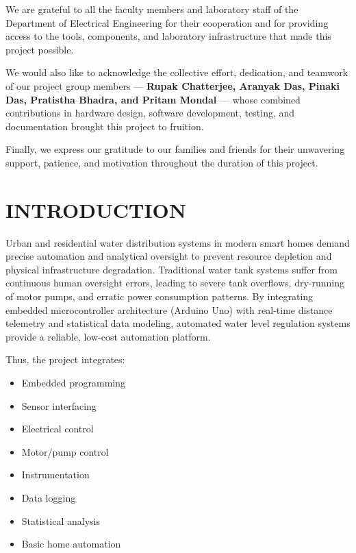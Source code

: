\documentclass[12pt,a4paper]{article}
\begin{document}
We are grateful to all the faculty members and laboratory staff of the Department of Electrical Engineering for their cooperation and for providing access to the tools, components, and laboratory infrastructure that made this project possible.

We would also like to acknowledge the collective effort, dedication, and teamwork of our project group members --- \textbf{Rupak Chatterjee, Aranyak Das, Pinaki Das, Pratistha Bhadra, and Pritam Mondal} --- whose combined contributions in hardware design, software development, testing, and documentation brought this project to fruition.

Finally, we express our gratitude to our families and friends for their unwavering support, patience, and motivation throughout the duration of this project.
\newpage

\tableofcontents

\newpage
\listoffigures


\listoftables


\newpage

\newpage
{}
\setcounter{page}{1}

\section{INTRODUCTION}

Urban and residential water distribution systems in modern smart homes demand precise automation and analytical oversight to prevent resource depletion and physical infrastructure degradation. Traditional water tank systems suffer from continuous human oversight errors, leading to severe tank overflows, dry-running of motor pumps, and erratic power consumption patterns. By integrating embedded microcontroller architecture (Arduino Uno) with real-time distance telemetry and statistical data modeling, automated water level regulation systems provide a reliable, low-cost automation platform.

Thus, the project integrates:

\begin{itemize}
    \item Embedded programming
    \item Sensor interfacing
    \item Electrical control
    \item Motor/pump control
    \item Instrumentation
    \item Data logging
    \item Statistical analysis
    \item Basic home automation
\end{itemize}
\end{document}

